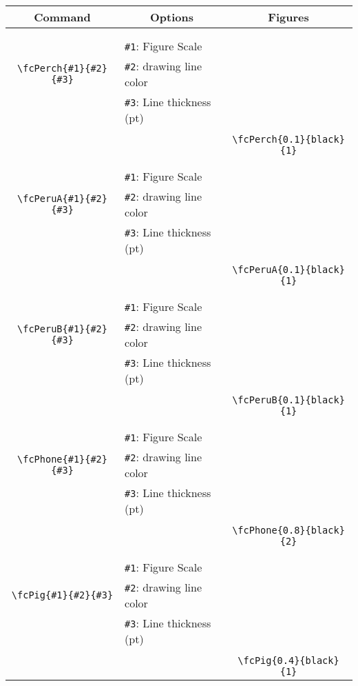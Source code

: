 \documentclass[x11names]{article}
\begin{document}
\begin{table}[H]\centering\begin{tabular}{|c|l|c|}\hline {\bf Command}& \multicolumn{1}{c|}{{\bf Options}} & {\bf Figures}\\  \hline	&&\multirow{5}{*}{\fcPerch{0.1}{black}{1}}\\	&&\\	&\verb|#1|: Figure Scale &\\	\verb|\fcPerch{#1}{#2}{#3}|&	\verb|#2|: drawing line color &\\	&\verb|#3|: Line thickness (pt) &\\ &&\\&&	\verb|\fcPerch{0.1}{black}{1}|\\\hline 	
	&&\multirow{5}{*}{\fcPeruA{0.1}{black}{1}}\\	&&\\	&\verb|#1|: Figure Scale &\\	\verb|\fcPeruA{#1}{#2}{#3}|&	\verb|#2|: drawing line color &\\	&\verb|#3|: Line thickness (pt) &\\ &&\\&&	\verb|\fcPeruA{0.1}{black}{1}|\\\hline 	
	&&\multirow{5}{*}{\fcPeruB{0.1}{black}{1}}\\	&&\\	&\verb|#1|: Figure Scale &\\	\verb|\fcPeruB{#1}{#2}{#3}|&	\verb|#2|: drawing line color &\\	&\verb|#3|: Line thickness (pt) &\\ &&\\&&	\verb|\fcPeruB{0.1}{black}{1}|\\\hline 	
	&&\multirow{5}{*}{\fcPhone{0.8}{black}{2}}\\	&&\\	&\verb|#1|: Figure Scale &\\	\verb|\fcPhone{#1}{#2}{#3}|&	\verb|#2|: drawing line color &\\	&\verb|#3|: Line thickness (pt) &\\ &&\\&&	\verb|\fcPhone{0.8}{black}{2}|\\\hline 	
	&&\multirow{5}{*}{\fcPig{0.4}{black}{1}}\\	&&\\	&\verb|#1|: Figure Scale &\\	\verb|\fcPig{#1}{#2}{#3}|&	\verb|#2|: drawing line color &\\	&\verb|#3|: Line thickness (pt) &\\ &&\\&&	\verb|\fcPig{0.4}{black}{1}|\\\hline 	

\end{tabular}
\end{table}
\end{document}
